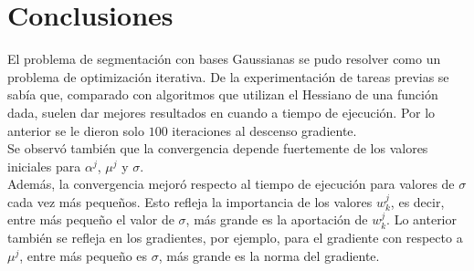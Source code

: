 \documentclass[11pt,letterpaper]{article}
\theoremstyle{definition}
\theoremstyle{definition}
\theoremstyle{definition}
\begin{document}
\section{Conclusiones}
	El problema de segmentación con bases Gaussianas se pudo resolver como un problema de optimización iterativa. De la experimentación de tareas previas se sabía que, comparado con algoritmos que utilizan el Hessiano de una función dada, suelen dar mejores resultados en cuando a tiempo de ejecución. Por lo anterior se le dieron solo $ 100 $ iteraciones al descenso gradiente. 
	\\
	Se observó también que la convergencia depende fuertemente de los valores iniciales para $ \alpha^j $, $ \mu^j $ y $ \sigma $.
	\\
	Además, la convergencia mejoró respecto al tiempo de ejecución para valores de $ \sigma $ cada vez más pequeños. Esto refleja la importancia de los valores $ w_k^j $, es decir, entre más pequeño el valor de $ \sigma $, más grande es la aportación de $ w_k^j $. Lo anterior también se refleja en los gradientes, por ejemplo, para el gradiente con respecto a $ \mu^j $, entre más pequeño es $ \sigma $, más grande es la norma del gradiente.
\end{document}
